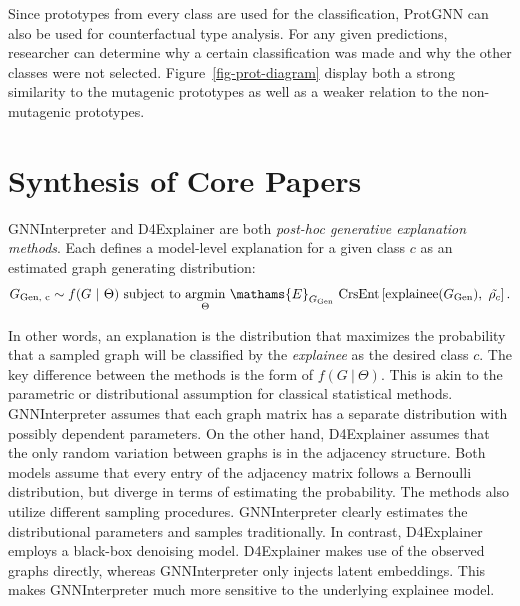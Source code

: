 \documentclass[
  11pt,
  letterpaper,
]{article}
\begin{document}
Since prototypes from every class are used for the classification,
ProtGNN can also be used for counterfactual type analysis. For any given
predictions, researcher can determine why a certain classification was
made and why the other classes were not selected.
Figure~\ref{fig-prot-diagram} display both a strong similarity to the
mutagenic prototypes as well as a weaker relation to the non-mutagenic
prototypes.

\hypertarget{synthesis-of-core-papers}{%
\section{Synthesis of Core Papers}\label{synthesis-of-core-papers}}

\quad GNNInterpreter and D4Explainer are both \emph{post-hoc generative
explanation methods}. Each defines a model-level explanation for a given
class \(c\) as an estimated graph generating distribution:\\
\begin{equation}
        G_\text{Gen, c} \sim f(G \ | \ \Theta) \text{ subject to } \underset{\Theta}{\text{argmin}}\ \mathams{E}_{G_\text{Gen}} \ \text{CrsEnt}\left[\text{explainee}(G_\text{Gen}), \ \tilde{\rho_c}\right].
    \end{equation}

In other words, an explanation is the distribution that maximizes the
probability that a sampled graph will be classified by the
\emph{explainee} as the desired class \(c\). The key difference between
the methods is the form of \(f(G \ | \ \Theta)\). This is akin to the
parametric or distributional assumption for classical statistical
methods. GNNInterpreter assumes that each graph matrix has a separate
distribution with possibly dependent parameters. On the other hand,
D4Explainer assumes that the only random variation between graphs is in
the adjacency structure. Both models assume that every entry of the
adjacency matrix follows a Bernoulli distribution, but diverge in terms
of estimating the probability. The methods also utilize different
sampling procedures. GNNInterpreter clearly estimates the distributional
parameters and samples traditionally. In contrast, D4Explainer employs a
black-box denoising model. D4Explainer makes use of the observed graphs
directly, whereas GNNInterpreter only injects latent embeddings. This
makes GNNInterpreter much more sensitive to the underlying explainee
model.
\end{document}
